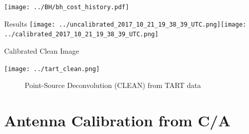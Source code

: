\documentclass[ignorenonframetext]{beamer}
\begin{document}
\begin{frame}
  \texttt{[image: ../BH/bh\_cost\_history.pdf]}
\end{frame}


\begin{frame}{Results}
\texttt{[image: ../uncalibrated\_2017\_10\_21\_19\_38\_39\_UTC.png]}\texttt{[image: ../calibrated\_2017\_10\_21\_19\_38\_39\_UTC.png]}
\end{frame}



\begin{frame}{Calibrated Clean Image}
\begin{center}
\texttt{[image: ../tart\_clean.png]}
\end{center}
\end{frame}


\begin{frame}
\begin{figure}[h!]
\centering    
{}
  \caption{Point-Source Deconvolution (CLEAN) from TART data}
 \end{figure} 
\end{frame}



\section{Antenna Calibration from C/A}

\frame{\tableofcontents[currentsection]}

% 
\end{document}
